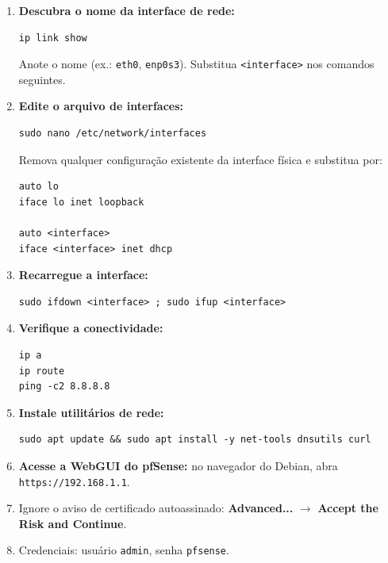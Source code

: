 \begin{enumerate}
\item \textbf{Descubra o nome da interface de rede:}
\begin{lstlisting}
ip link show
\end{lstlisting}
Anote o nome (ex.: \texttt{eth0}, \texttt{enp0s3}). Substitua \texttt{<interface>} nos comandos seguintes.

\item \textbf{Edite o arquivo de interfaces:}
\begin{lstlisting}
sudo nano /etc/network/interfaces
\end{lstlisting}
Remova qualquer configuração existente da interface física e substitua por:
\begin{lstlisting}
auto lo
iface lo inet loopback

auto <interface>
iface <interface> inet dhcp
\end{lstlisting}

\item \textbf{Recarregue a interface:}
\begin{lstlisting}
sudo ifdown <interface> ; sudo ifup <interface>
\end{lstlisting}

\item \textbf{Verifique a conectividade:}
\begin{lstlisting}
ip a
ip route
ping -c2 8.8.8.8
\end{lstlisting}


\item \textbf{Instale utilitários de rede:}
\begin{lstlisting}
sudo apt update && sudo apt install -y net-tools dnsutils curl
\end{lstlisting}


\item \textbf{Acesse a WebGUI do pfSense:} no navegador do Debian, abra \texttt{https://192.168.1.1}.

\item Ignore o aviso de certificado autoassinado: \textbf{Advanced...} $\rightarrow$ \textbf{Accept the Risk and Continue}.


\item Credenciais: usuário \texttt{admin}, senha \texttt{pfsense}.


\end{enumerate}

